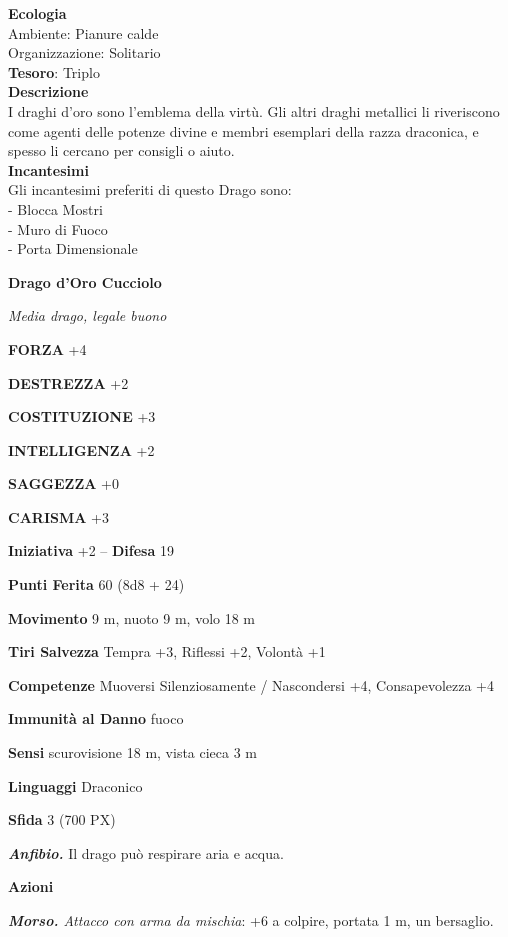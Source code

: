 \begin{multicols}{2}
	\textbf{Ecologia}\\
	Ambiente: Pianure calde\\
	Organizzazione: Solitario\\
	\textbf{Tesoro}: Triplo\\
	\textbf{Descrizione}\\
	I draghi d'oro sono l'emblema della virtù. Gli altri draghi metallici li riveriscono come agenti delle potenze divine e membri esemplari della razza draconica, e spesso li cercano per consigli o aiuto.\\
	\textbf{Incantesimi}\\
	Gli incantesimi preferiti di questo Drago sono:\\
	- Blocca Mostri\\
	- Muro di Fuoco\\
	- Porta Dimensionale

	\medskip{}\textbf{Drago d'Oro Cucciolo}

	\textit{Media drago, legale buono}

	\textbf{FORZA} +4

	\textbf{DESTREZZA} +2

	\textbf{COSTITUZIONE} +3

	\textbf{INTELLIGENZA} +2

	\textbf{SAGGEZZA} +0

	\textbf{CARISMA} +3

	\textbf{Iniziativa} +2 -- \textbf{Difesa} 19

	\textbf{Punti Ferita} 60 (8d8 + 24)

	\textbf{Movimento} 9 m, nuoto 9 m, volo 18 m

	\textbf{Tiri Salvezza} Tempra +3, Riflessi +2, Volontà +1

	\textbf{Competenze} Muoversi Silenziosamente / Nascondersi +4, Consapevolezza +4

	\textbf{Immunità al Danno} fuoco

	\textbf{Sensi} scurovisione 18 m, vista cieca 3 m

	\textbf{Linguaggi} Draconico

	\textbf{Sfida} 3 (700 PX)

	\textit{\textbf{Anfibio.}} Il drago può respirare aria e acqua.

	\textbf{Azioni}

	\textit{\textbf{Morso.} Attacco con arma da mischia}: +6 a colpire, portata 1 m, un bersaglio.


\end{multicols}
